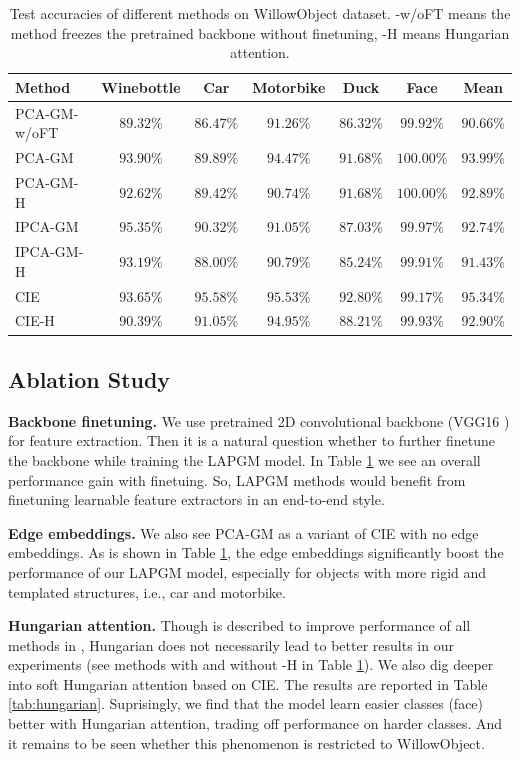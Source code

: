 \documentclass[a4paper]{article}
\begin{document}
\begin{table}[htbp]
    \centering
    \begin{tabular}{lcccccc}
        \toprule
        Method& Winebottle& Car& Motorbike& Duck& Face& Mean\\
        \midrule
        PCA-GM-w/oFT& $89.32\%$& $86.47\%$& $91.26\%$& $86.32\%$& $99.92\%$& $90.66\%$\\
        PCA-GM& $93.90\%$& $89.89\%$& $94.47\%$& $91.68\%$& $\mathbf{100.00\%}$& $93.99\%$\\
        PCA-GM-H& $92.62\%$& $89.42\%$& $90.74\%$& $91.68\%$& $\mathbf{100.00\%}$& $92.89\%$\\
        IPCA-GM& $\mathbf{95.35\%}$& $90.32\%$& $91.05\%$& $87.03\%$& $99.97\%$&$92.74\%$ \\
        IPCA-GM-H& $93.19\%$& $88.00\%$& $90.79\%$& $85.24\%$& $99.91\%$& $91.43\%$\\
        CIE& $93.65\%$& $\mathbf{95.58\%}$& $\mathbf{95.53\%}$& $\mathbf{92.80\%}$& $99.17\%$& $\mathbf{95.34\%}$\\
        CIE-H& $90.39\%$& $91.05\%$& $94.95\%$& $88.21\%$& $99.93\%$& $92.90\%$\\
        \bottomrule
    \end{tabular}
    \caption{Test accuracies of different methods on WillowObject dataset. -w/oFT means the method freezes the pretrained backbone without finetuning, -H means Hungarian attention.}
    \label{tab:compare}
\end{table}

\subsection{Ablation Study}
\textbf{Backbone finetuning.}
We use pretrained 2D convolutional backbone (VGG16 \cite{vgg}) for feature extraction. Then it is a natural question whether to further finetune the backbone while training the LAPGM model. In Table \ref{tab:compare} we see an overall performance gain with finetuing. So, LAPGM methods would benefit from finetuning learnable feature extractors in an end-to-end style.

\textbf{Edge embeddings.} 
We also see PCA-GM as a variant of CIE with no edge embeddings. As is shown in Table \ref{tab:compare}, the edge embeddings significantly boost the performance of our LAPGM model, especially for objects with more rigid and templated structures, i.e., car and motorbike.

\textbf{Hungarian attention.}
Though is described to improve performance of all methods in \cite{cie}, Hungarian does not necessarily lead to better results in our experiments (see methods with and without -H in Table \ref{tab:compare}). We also dig deeper into soft Hungarian attention based on CIE. The results are reported in Table \ref{tab:hungarian}. Suprisingly, we find that the model learn easier classes (face) better with Hungarian attention, trading off performance on harder classes. And it remains to be seen whether this phenomenon is restricted to WillowObject.
\end{document}
